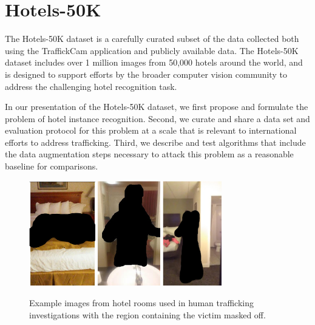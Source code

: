 
\chapter{Hotels-50K}
\label{ch:4}

The Hotels-50K dataset is a carefully curated subset of the data collected both using the TraffickCam application and publicly available data. The Hotels-50K dataset includes over 1 million images from 50,000 hotels around the world, and is designed to support efforts by the broader computer vision community to address the challenging hotel recognition task.

In our presentation of the Hotels-50K dataset, we first propose and formulate the problem of hotel instance recognition.  Second, we curate and share a data set and evaluation protocol for this problem at a scale that is relevant to international efforts to address trafficking.  Third, we describe and test algorithms that include the data augmentation steps necessary to attack this problem as a reasonable baseline for comparisons.

\begin{figure}
    \centering
    \includegraphics[height=1.8in]{figures/chapter3/example_images/queries/1.png}
    \includegraphics[height=1.8in]{figures/chapter3/example_images/queries/2.png}
    \includegraphics[height=1.8in]{figures/chapter3/example_images/queries/3.png}
    \caption{Example images from hotel rooms used in human trafficking investigations with the region containing the victim masked off.}
    \label{fig:queries}
\end{figure}

